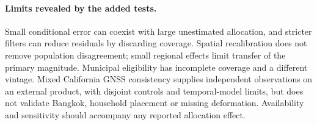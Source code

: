 \paragraph{Limits revealed by the added tests.} Small conditional error can coexist with large unestimated allocation, and stricter filters can reduce residuals by discarding coverage. Spatial recalibration does not remove population disagreement; small regional effects limit transfer of the primary magnitude. Municipal eligibility has incomplete coverage and a different vintage. Mixed California GNSS consistency supplies independent observations on an external product, with disjoint controls and temporal-model limits, but does not validate Bangkok, household placement or missing deformation. Availability and sensitivity should accompany any reported allocation effect.

